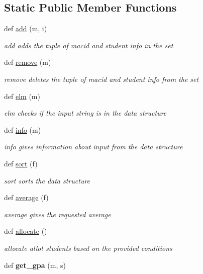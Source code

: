 \subsection*{Static Public Member Functions}
\begin{DoxyCompactItemize}
\item 
def \mbox{\hyperlink{class_s_a_lst_1_1_s_a_lst_aa262f4e962a9957c18833f65dc07c72a}{add}} (m, i)
\begin{DoxyCompactList}\small\item\em add adds the tuple of macid and student info in the set \end{DoxyCompactList}\item 
def \mbox{\hyperlink{class_s_a_lst_1_1_s_a_lst_a21390f23944739da71c78b8f684c7484}{remove}} (m)
\begin{DoxyCompactList}\small\item\em remove deletes the tuple of macid and student info from the set \end{DoxyCompactList}\item 
def \mbox{\hyperlink{class_s_a_lst_1_1_s_a_lst_ac2dc6bf81574e9e0e4a92be790460765}{elm}} (m)
\begin{DoxyCompactList}\small\item\em elm checks if the input string is in the data structure \end{DoxyCompactList}\item 
def \mbox{\hyperlink{class_s_a_lst_1_1_s_a_lst_ad28fcb7dd27999a47ab1d074e69dfaa9}{info}} (m)
\begin{DoxyCompactList}\small\item\em info gives information about input from the data structure \end{DoxyCompactList}\item 
def \mbox{\hyperlink{class_s_a_lst_1_1_s_a_lst_af39c6101199578aefb42a15719754a61}{sort}} (f)
\begin{DoxyCompactList}\small\item\em sort sorts the data structure \end{DoxyCompactList}\item 
def \mbox{\hyperlink{class_s_a_lst_1_1_s_a_lst_ae9c71d13a081d2eca72857c21840dd4b}{average}} (f)
\begin{DoxyCompactList}\small\item\em average gives the requested average \end{DoxyCompactList}\item 
def \mbox{\hyperlink{class_s_a_lst_1_1_s_a_lst_a8cdba5b89e936165b3628f52d4e80938}{allocate}} ()
\begin{DoxyCompactList}\small\item\em allocate allot students based on the provided conditions \end{DoxyCompactList}\item 
\mbox{\label{class_s_a_lst_1_1_s_a_lst_a6bce06cad98e19185ec193f471ec0fdb}} 
def {\bfseries get\+\_\+gpa} (m, s)
\end{DoxyCompactItemize}
